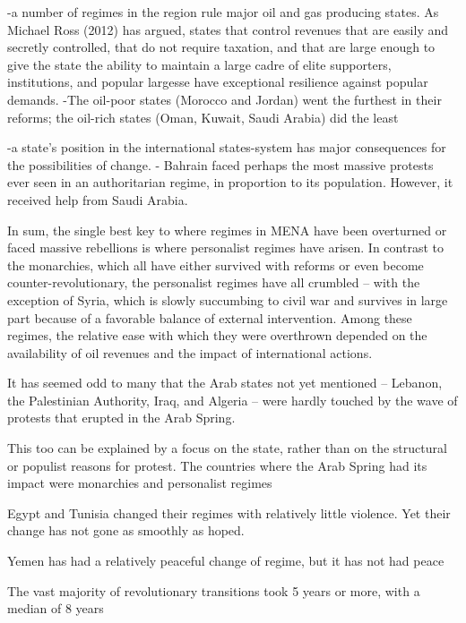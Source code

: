 -a number of regimes in the region rule major oil and gas producing states. As Michael Ross (2012) has argued, states that control revenues that are easily and secretly controlled, that do not require taxation, and that are large enough to give the state the ability to maintain a large cadre of elite supporters, institutions, and popular largesse have exceptional resilience against popular demands.
    -The oil-poor states (Morocco and Jordan) went the furthest in their reforms; the oil-rich states (Oman, Kuwait, Saudi Arabia) did the least
    
-a state’s position in the international states-system has major consequences for the possibilities of change.
    - Bahrain faced perhaps the most massive protests ever seen in an authoritarian regime, in proportion to its population. However, it received help from Saudi Arabia.

In sum, the single best key to where regimes in MENA have been overturned or faced massive rebellions is where personalist regimes have arisen. In contrast to the monarchies, which all have either survived with reforms or even become counter-revolutionary, the personalist regimes have all crumbled – with the exception of Syria, which is slowly succumbing to civil war and survives in large part because of a favorable balance of external intervention.
Among these regimes, the relative ease with which they were overthrown depended on the availability of oil revenues and the impact of international actions.


It has seemed odd to many that the Arab states not yet mentioned – Lebanon, the Palestinian Authority, Iraq, and Algeria – were hardly touched by the wave of protests that erupted in the Arab Spring.

This too can be explained by a focus on the state, rather than on the structural or populist reasons for protest. The countries where the Arab Spring had its impact were monarchies and personalist regimes

Egypt and Tunisia changed their regimes with relatively little violence. Yet their change has not gone as smoothly as hoped.

Yemen has had a relatively peaceful change of regime, but it has not had peace

The vast majority of revolutionary transitions took 5 years or more, with a median of 8 years

